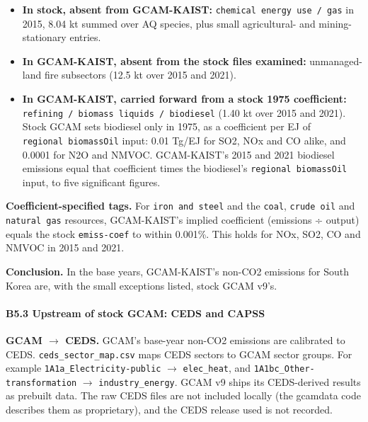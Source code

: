 \begin{itemize}
\tightlist
\item
  \textbf{In
  stock,
  absent
  from
  GCAM-KAIST:}
  \texttt{chemical\ energy\ use\ /\allowbreak{}\ gas}
  in 2015,
  8.04 kt
  summed
  over AQ
  species,
  plus
  small
  agricultural-
  and
  mining-stationary
  entries.
\item
  \textbf{In
  GCAM-KAIST,
  absent
  from the
  stock
  files
  examined:}
  unmanaged-land fire subsectors (12.5 kt over 2015 and 2021).
\item
  \textbf{In GCAM-KAIST, carried forward from a stock 1975 coefficient:}
  \texttt{refining\ /\allowbreak{}\ biomass\ liquids\ /\allowbreak{}\ biodiesel}
  (1.40 kt over 2015 and 2021). Stock GCAM sets biodiesel only in 1975, as a
  coefficient per EJ of \texttt{regional\ biomassOil} input: 0.01 Tg/EJ for
  SO2, NOx and CO alike, and 0.0001 for N2O and NMVOC. GCAM-KAIST's 2015 and
  2021 biodiesel emissions equal that coefficient times the biodiesel's
  \texttt{regional\ biomassOil} input, to five significant figures.
\end{itemize}

\textbf{Coefficient-specified
tags.} For
\texttt{iron\ and\ steel}
and the
\texttt{coal},
\texttt{crude\ oil}
and
\texttt{natural\ gas}
resources,
GCAM-KAIST's
implied
coefficient
(emissions
÷ output)
equals the
stock
\texttt{emiss-\allowbreak{}coef}
to within
0.001\%.
This holds
for NOx,
SO2, CO
and NMVOC
in 2015
and 2021.

\textbf{Conclusion.}
In the
base
years,
GCAM-KAIST's
non-CO2
emissions
for South
Korea are,
with the
small
exceptions
listed,
stock GCAM
v9's.

\hypertarget{b5.3-upstream-of-stock-gcam-ceds-and-capss}{%
\paragraph{B5.3 Upstream of stock GCAM: CEDS and
CAPSS}\label{b5.3-upstream-of-stock-gcam-ceds-and-capss}}
\mbox{}\par

\textbf{GCAM $\rightarrow$ CEDS.} GCAM's base-year non-CO2 emissions are calibrated to
CEDS. \texttt{ceds\_\allowbreak{}sector\_\allowbreak{}map.\allowbreak{}csv} maps CEDS
sectors to GCAM sector groups. For example
\texttt{1A1a\_\allowbreak{}Electricity-\allowbreak{}public} $\rightarrow$
\texttt{elec\_\allowbreak{}heat}, and
\texttt{1A1bc\_\allowbreak{}Other-\allowbreak{}transformation} $\rightarrow$
\texttt{industry\_\allowbreak{}energy}. GCAM v9 ships its CEDS-derived results as
prebuilt data. The raw CEDS files are not included locally (the gcamdata code
describes them as proprietary), and the CEDS release used is not recorded.

